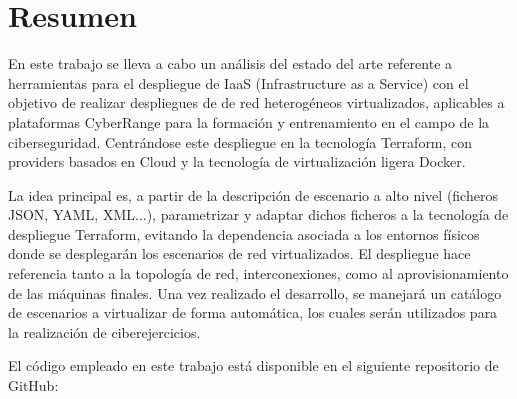 \newpage
\thispagestyle{plain}
\section*{Resumen}

En este trabajo se lleva a cabo un análisis del estado del arte referente a herramientas para el despliegue de IaaS (Infrastructure as a Service) con el objetivo de realizar despliegues de de red heterogéneos virtualizados, aplicables a plataformas CyberRange para la formación y entrenamiento en el campo de la ciberseguridad. Centrándose este despliegue en la tecnología Terraform, con providers basados en Cloud y la tecnología de virtualización ligera Docker.

La idea principal es, a partir de la descripción de escenario a alto nivel (ficheros JSON, YAML, XML...), parametrizar y adaptar dichos ficheros a la tecnología de despliegue Terraform, evitando la dependencia asociada a los entornos físicos donde se desplegarán los escenarios de red virtualizados. El despliegue hace referencia tanto a la topología de red, interconexiones, como al aprovisionamiento de las máquinas finales. Una vez realizado el desarrollo, se manejará un catálogo de escenarios a virtualizar de forma automática, los cuales serán utilizados para la realización de ciberejercicios.

El código empleado en este trabajo está disponible en el siguiente repositorio de GitHub:

\vspace{0.2cm}

\begin{tcolorbox}[enhanced,attach boxed title to top center={yshift=-3mm,yshifttext=-1mm},
  colback=brown!20!white,colframe=orange!75!black,colbacktitle=orange!80!black,
  title=Dirección URL,fonttitle=\bfseries,
  boxed title style={size=small,colframe=orange!50!black} ]
  \centering
  \href{https://github.com/samugs13/DAERV}{\textbf{\color{blue}{https://github.com/samugs13/DAERV}}}
\end{tcolorbox}

\afterpage{\blankpage}
